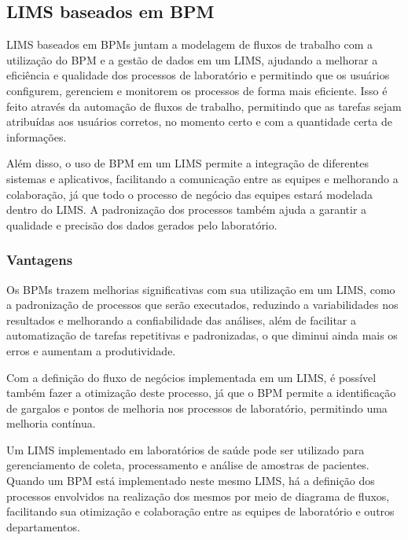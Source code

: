 \subsection{LIMS baseados em BPM}


LIMS baseados em BPMs juntam a modelagem de fluxos de trabalho com a utilização do BPM e a gestão de dados em um LIMS, ajudando a melhorar a eficiência e qualidade dos processos de laboratório e permitindo que os usuários configurem, gerenciem e monitorem os processos de forma mais eficiente. Isso é feito através da automação de fluxos de trabalho, permitindo que as tarefas sejam atribuídas aos usuários corretos, no momento certo e com a quantidade certa de informações. \R

Além disso, o uso de BPM em um LIMS permite a integração de diferentes sistemas e aplicativos, facilitando a comunicação entre as equipes e melhorando a colaboração, já que todo o processo de negócio das equipes estará modelada dentro do LIMS. A padronização dos processos também ajuda a garantir a qualidade e precisão dos dados gerados pelo laboratório.


\subsubsection{Vantagens}

Os BPMs trazem melhorias significativas com sua utilização em um LIMS, como a padronização de processos que serão executados, reduzindo a variabilidades nos resultados e melhorando a confiabilidade das análises, além de facilitar a automatização de tarefas repetitivas e padronizadas, o que diminui ainda mais os erros e aumentam a produtividade.

Com a definição do fluxo de negócios implementada em um LIMS, é possível também fazer a otimização deste processo, já que o BPM permite a identificação de gargalos e pontos de melhoria nos processos de laboratório, permitindo uma melhoria contínua.

Um LIMS implementado em laboratórios de saúde pode ser utilizado para gerenciamento de coleta, processamento e análise de amostras de pacientes. Quando um BPM está implementado neste mesmo LIMS, há a definição dos processos envolvidos na realização dos mesmos por meio de diagrama de fluxos, facilitando sua otimização e colaboração entre as equipes de laboratório e outros departamentos.

